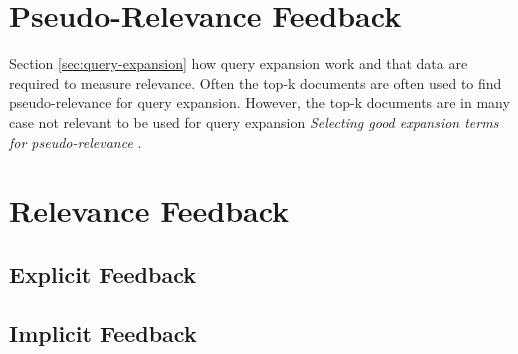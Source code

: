 \section{Pseudo-Relevance Feedback}
Section \ref{sec:query-expansion} how query expansion work and that data are required to measure relevance.
Often the top-k documents are often used to find pseudo-relevance for query expansion.
However, the top-k documents are in many case not relevant to be used for query expansion \textit{Selecting good expansion terms for pseudo-relevance} \cite{pseudo-relevance-invalid}. 

\section{Relevance Feedback}

\subsection{Explicit Feedback}

\subsection{Implicit Feedback}
